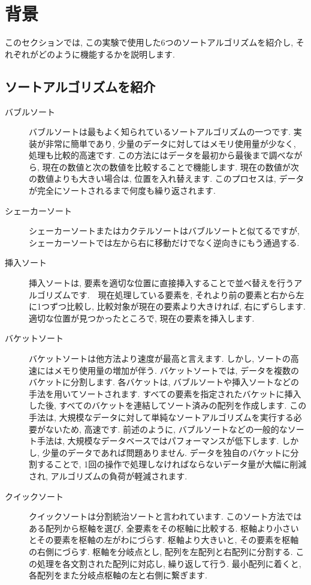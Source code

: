 \documentclass[a4j, 12pt]{jarticle}
\begin{document}
\section{背景}
このセクションでは, この実験で使用した6つのソートアルゴリズムを紹介し, それぞれがどのように機能するかを説明します.
\subsection{ソートアルゴリズムを紹介}
\begin{description}
  \item[バブルソート] バブルソートは最もよく知られているソートアルゴリズムの一つです. 実装が非常に簡単であり, 少量のデータに対してはメモリ使用量が少なく, 処理も比較的高速です. この方法にはデータを最初から最後まで調べながら, 現在の数値と次の数値を比較することで機能します. 現在の数値が次の数値よりも大きい場合は, 位置を入れ替えます. このプロセスは, データが完全にソートされるまで何度も繰り返されます.\\
  \item[シェーカーソート] シェーカーソートまたはカクテルソートはバブルソートと似てるですが, シェーカーソートでは左から右に移動だけでなく逆向きにもう通過する. \\
  \item[挿入ソート] 挿入ソートは, 要素を適切な位置に直接挿入することで並べ替えを行うアルゴリズムです.　現在処理している要素を, それより前の要素と右から左に1つずつ比較し, 比較対象が現在の要素より大きければ, 右にずらします.　適切な位置が見つかったところで, 現在の要素を挿入します. \\
  \item[バケットソート] バケットソートは他方法より速度が最高と言えます. しかし, ソートの高速にはメモり使用量の増加が伴う. バケットソートでは, データを複数のバケットに分割します. 各バケットは, バブルソートや挿入ソートなどの手法を用いてソートされます. すべての要素を指定されたバケットに挿入した後, すべてのバケットを連結してソート済みの配列を作成します. この手法は, 大規模なデータに対して単純なソートアルゴリズムを実行する必要がないため, 高速です. 前述のように, バブルソートなどの一般的なソート手法は, 大規模なデータベースではパフォーマンスが低下します. しかし, 少量のデータであれば問題ありません. データを独自のバケットに分割することで, 1回の操作で処理しなければならないデータ量が大幅に削減され, アルゴリズムの負荷が軽減されます. \\
  \item[クイックソート] クイックソートは分割統治ソートと言われています. このソート方法ではある配列から枢軸を選び, 全要素をその枢軸に比較する. 枢軸より小さいとその要素を枢軸の左がわにづらす. 枢軸より大きいと, その要素を枢軸の右側にづらす. 枢軸を分岐点とし, 配列を左配列と右配列に分割する. この処理を各文割された配列に対応し, 繰り返して行う. 最小配列に着くと, 各配列をまた分岐点枢軸の左と右側に繋ぎます. \\

\end{description}
\end{document}
